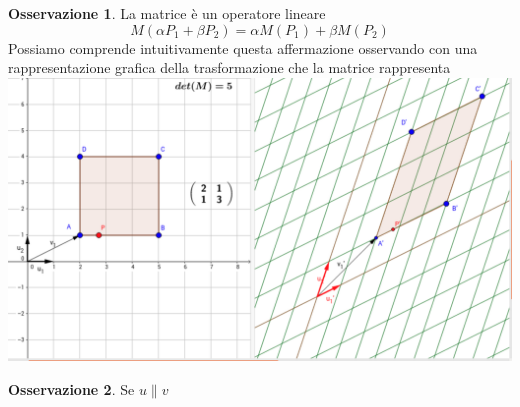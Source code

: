 \documentclass[10pt,a4paper]{article}
\theoremstyle{plain}
\theoremstyle{definition}
\newtheorem{osservazione}{Osservazione}
\begin{document}
	\begin{osservazione}La matrice è un operatore lineare
		\[
		M(\alpha P_1 + \beta P_2)= \alpha M(P_1) + \beta M(P_2)
		\]
	Possiamo comprende intuitivamente questa affermazione osservando con una rappresentazione grafica della trasformazione che la matrice rappresenta\\
	
	\includegraphics[scale=0.2]{matrix.png}
	\end{osservazione}
	\begin{osservazione}
		Se $u \parallel v$
	\end{osservazione}
\end{document}
